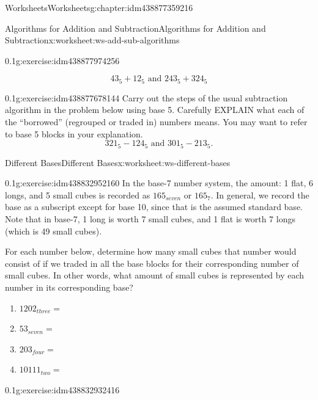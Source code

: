 \documentclass[twoside,11pt,]{book}
\begin{document}
\begin{chapterptx}{Worksheets}{}{Worksheets}{}{}{g:chapter:idm438877359216}
\begin{worksheet-section-numberless}{Algorithms for Addition and Subtraction}{}{Algorithms for Addition and Subtraction}{}{}{x:worksheet:ws-add-sub-algorithms}
\begin{divisionexercise}{1}{}{0.1}{g:exercise:idm438877974256}
\par
%
\begin{equation*}
43_{5}+12_{5} \text{ and } 243_{5}+324_{5}
\end{equation*}
%
\end{divisionexercise}%
\clearpage
\begin{divisionexercise}{2}{}{0.1}{g:exercise:idm438877678144}%
Carry out the steps of the usual subtraction algorithm in the problem below using base 5.  Carefully EXPLAIN what each of the ``borrowed'' (regrouped or traded in) numbers means.  You may want to refer to base 5 blocks in your explanation.%
\begin{equation*}
321_{5}-124_5 \text{ and } 301_5-213_5 \text{.}
\end{equation*}
%
\end{divisionexercise}%
\end{worksheet-section-numberless}
\restoregeometry
%
%
\typeout{************************************************}
\typeout{************************************************}
%
\begin{worksheet-section-numberless}{Different Bases}{}{Different Bases}{}{}{x:worksheet:ws-different-bases}
\begin{divisionexercise}{1}{}{0.1}{g:exercise:idm438832952160}%
In the base-7 number system, the amount: 1 flat, 6 longs, and 5 small cubes is recorded as \(165_{seven}\) or \(165_7\). In general, we record the base as a subscript except for base 10, since that is the assumed standard base.  Note that in base-7, 1 long is worth 7 small cubes, and 1 flat is worth 7 longs (which is 49 small cubes).%
\par
For each number below, determine how many small cubes that number would consist of if we traded in all the base blocks for their corresponding number of small cubes.  In other words, what amount of small cubes is represented by each number in its corresponding base?%
\leavevmode%
\begin{enumerate}[label=(\alph*)]
\item{}\(1202_{three}   = \)%
\item{}\(53_{seven}       = \)%
\item{}\(203_{four}       = \)%
\item{}\(10111_{two}       = \)%
\end{enumerate}
\end{divisionexercise}%
\begin{divisionexercise}{2}{}{0.1}{g:exercise:idm438832932416}%

\end{divisionexercise}
\end{worksheet-section-numberless}
\end{chapterptx}
\end{document}
